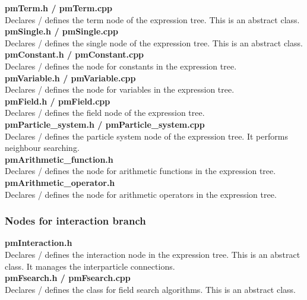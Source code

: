\documentclass[a4paper,12pt,openany]{book}
\theoremstyle{break}
\begin{document}
\textbf{pmTerm.h / pmTerm.cpp} \\
Declares / defines the term node of the expression tree. This is an abstract class. \\

\textbf{pmSingle.h / pmSingle.cpp} \\
Declares / defines the single node of the expression tree. This is an abstract class. \\

\textbf{pmConstant.h / pmConstant.cpp} \\
Declares / defines the node for constants in the expression tree. \\

\textbf{pmVariable.h / pmVariable.cpp} \\
Declares / defines the node for variables in the expression tree. \\

\textbf{pmField.h / pmField.cpp} \\
Declares / defines the field node of the expression tree. \\

\textbf{pmParticle\_system.h / pmParticle\_system.cpp} \\
Declares / defines the particle system node of the expression tree. It performs neighbour searching. \\

\textbf{pmArithmetic\_function.h} \\
Declares / defines the node for arithmetic functions in the expression tree. \\

\textbf{pmArithmetic\_operator.h} \\
Declares / defines the node for arithmetic operators in the expression tree. \\


\subsubsection{Nodes for interaction branch}
\textbf{pmInteraction.h} \\
Declares / defines the interaction node in the expression tree. This is an abstract class. It manages the interparticle connections. \\

\textbf{pmFsearch.h / pmFsearch.cpp} \\
Declares / defines the class for field search algorithms. This is an abstract class. \\
\end{document}
